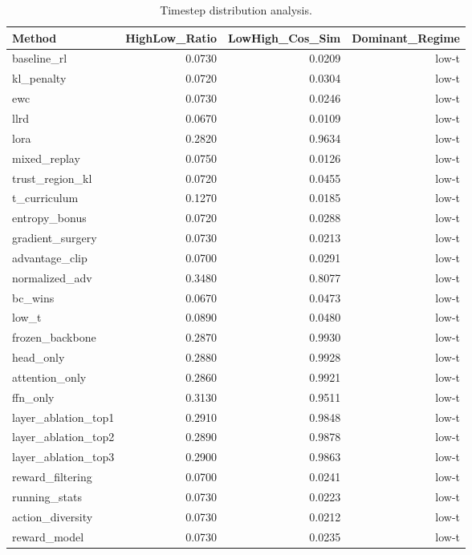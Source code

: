\begin{table}[htbp]
\centering
\caption{Timestep distribution analysis.}
\label{tab:t_dist}
\begin{tabular}{lrrr}
\toprule
\textbf{Method} & \textbf{HighLow_Ratio} & \textbf{LowHigh_Cos_Sim} & \textbf{Dominant_Regime} \\
\midrule
baseline_rl & 0.0730 & 0.0209 & low-t \\
kl_penalty & 0.0720 & 0.0304 & low-t \\
ewc & 0.0730 & 0.0246 & low-t \\
llrd & 0.0670 & 0.0109 & low-t \\
lora & 0.2820 & 0.9634 & low-t \\
mixed_replay & 0.0750 & 0.0126 & low-t \\
trust_region_kl & 0.0720 & 0.0455 & low-t \\
t_curriculum & 0.1270 & 0.0185 & low-t \\
entropy_bonus & 0.0720 & 0.0288 & low-t \\
gradient_surgery & 0.0730 & 0.0213 & low-t \\
advantage_clip & 0.0700 & 0.0291 & low-t \\
normalized_adv & 0.3480 & 0.8077 & low-t \\
bc_wins & 0.0670 & 0.0473 & low-t \\
low_t & 0.0890 & 0.0480 & low-t \\
frozen_backbone & 0.2870 & 0.9930 & low-t \\
head_only & 0.2880 & 0.9928 & low-t \\
attention_only & 0.2860 & 0.9921 & low-t \\
ffn_only & 0.3130 & 0.9511 & low-t \\
layer_ablation_top1 & 0.2910 & 0.9848 & low-t \\
layer_ablation_top2 & 0.2890 & 0.9878 & low-t \\
layer_ablation_top3 & 0.2900 & 0.9863 & low-t \\
reward_filtering & 0.0700 & 0.0241 & low-t \\
running_stats & 0.0730 & 0.0223 & low-t \\
action_diversity & 0.0730 & 0.0212 & low-t \\
reward_model & 0.0730 & 0.0235 & low-t \\
\bottomrule
\end{tabular}
\end{table}
